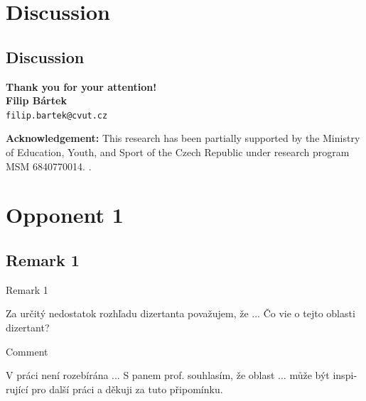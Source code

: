\documentclass[a4paper]{beamer}
\makeatletter
\def\uv#1{\char92\relax #1\char34\relax}
\newcommand\FirstName{Filip}
\newcommand\LastName{Bártek}
\newcommand\Email{filip.bartek@cvut.cz}
\makeatother
\begin{document}
\section*{Discussion}
\subsection*{Discussion}
\begin{frame}
\begin{center}
\vspace*{1cm}
{\bf Thank you for your attention!}\\
\vspace*{2cm}
{\bf\Large \FirstName{} \LastName{}}\\
{\tt \Email}
\vspace*{1cm}
\end{center}
\vfill
{\tiny {\bf Acknowledgement:} This research has been partially supported by the Ministry of Education, Youth, and Sport of the Czech Republic under research program MSM 6840770014. .}
\end{frame}
%
\appendix
\section{Opponent 1}
\subsection{Remark 1}
\begin{frame}
\begin{block}{Remark 1}
\begin{otherlanguage}{slovak}
Za určitý nedostatok \uv{rozhľadu} dizertanta považujem, že ... Čo vie o tejto oblasti dizertant?
\end{otherlanguage}
\end{block}
\begin{exampleblock}{Comment}
\begin{otherlanguage}{czech}
V práci není rozebírána ... S panem prof. souhlasím, že oblast ... může být inspirující pro další práci a děkuji za tuto připomínku.
\end{otherlanguage}
\end{exampleblock}
\end{frame}
\end{document}
